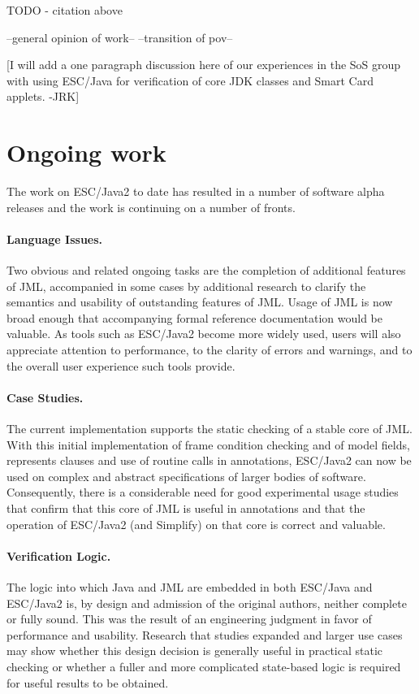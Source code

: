 \documentclass{acm_proc_article-sp}
\begin{document}
TODO - citation above

--general opinion of work--
--transition of pov--

[I will add a one paragraph discussion here of our experiences in
the SoS group with using ESC/Java for verification of core JDK classes
and Smart Card applets. -JRK]

\section{Ongoing work}
The work on ESC/Java2 to date has resulted in a number of software
alpha releases and the work is continuing on a number of fronts.

\paragraph*{Language Issues.} Two obvious and related ongoing tasks are
the completion of additional features of JML, accompanied in some
cases by additional research to clarify the semantics and usability of
outstanding features of JML.  Usage of JML is now broad enough that
accompanying formal reference documentation would be valuable.  As
tools such as ESC/Java2 become more widely used, users will also
appreciate attention to performance, to the clarity of errors and
warnings, and to the overall user experience such tools provide.

\paragraph*{Case Studies.} The current implementation supports the
static checking of a stable core of JML.  With this initial
implementation of frame condition checking and of model fields,
represents clauses and use of routine calls in annotations, ESC/Java2
can now be used on complex and abstract specifications of larger
bodies of software.  Consequently, there is a considerable need for
good experimental usage studies that confirm that this core of JML is
useful in annotations and that the operation of ESC/Java2 (and
Simplify) on that core is correct and valuable.

\paragraph*{Verification Logic.} The logic into which Java and JML are
embedded in both ESC/Java and ESC/Java2 is, by design and admission of the original
authors, neither complete or fully sound.  This was the result of an
engineering judgment in favor of performance and usability.  Research
that studies expanded and larger use cases may show whether this
design decision is generally useful in practical static checking or
whether a fuller and more complicated state-based logic is required
for useful results to be obtained. 
\end{document}
